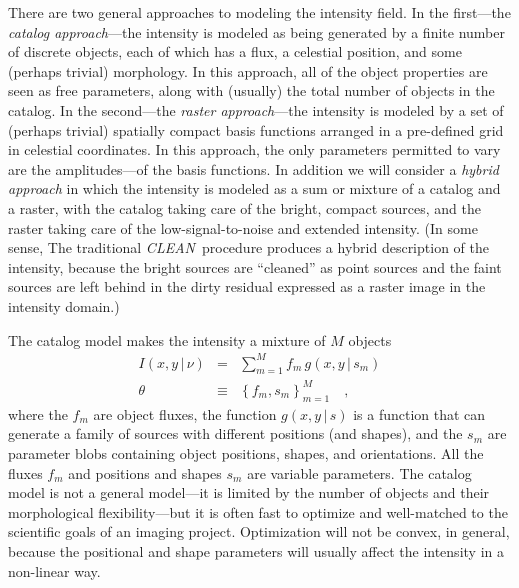 \documentclass[12pt]{article}
\newcommand{\project}[1]{\textsl{#1}}
\newcommand{\CLEAN}{\project{CLEAN}}
\newcommand{\set}[1]{\left\{{#1}\right\}}
\newcommand{\given}{\,|\,}
\begin{document}
There are two general approaches to modeling the intensity field.  In
the first---the \emph{catalog approach}---the intensity is modeled as
being generated by a finite number of discrete objects, each of which
has a flux, a celestial position, and some (perhaps trivial)
morphology.  In this approach, all of the object properties are seen
as free parameters, along with (usually) the total number of objects
in the catalog.  In the second---the \emph{raster approach}---the
intensity is modeled by a set of (perhaps trivial) spatially compact
basis functions arranged in a pre-defined grid in celestial
coordinates.  In this approach, the only parameters permitted to vary
are the amplitudes---of the basis functions.  In addition we will
consider a \emph{hybrid approach} in which the intensity is modeled as
a sum or mixture of a catalog and a raster, with the catalog taking
care of the bright, compact sources, and the raster taking care of the
low-signal-to-noise and extended intensity.  (In some sense, The
traditional \CLEAN\ procedure produces a hybrid description of the
intensity, because the bright sources are ``cleaned'' as point sources
and the faint sources are left behind in the dirty residual expressed
as a raster image in the intensity domain.)

The catalog model makes the intensity a mixture of $M$ objects
\begin{eqnarray}
I(x,y\given\nu) &=& \sum_{m=1}^M f_m\,g(x,y\given s_m)
\\
\theta &\equiv& \set{f_m, s_m}_{m=1}^M
\quad,
\end{eqnarray}
where the $f_m$ are object fluxes, the function $g(x,y\given s)$ is a
function that can generate a family of sources with different
positions (and shapes), and the $s_m$ are parameter blobs containing
object positions, shapes, and orientations.  All the fluxes $f_m$ and
positions and shapes $s_m$ are variable parameters.  The catalog model
is not a general model---it is limited by the number of objects and
their morphological flexibility---but it is often fast to optimize and
well-matched to the scientific goals of an imaging project.
Optimization will not be convex, in general, because the positional
and shape parameters will usually affect the intensity in a non-linear
way.
\end{document}
